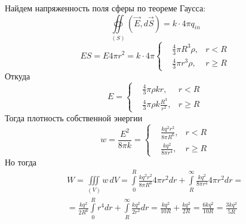 \documentclass[a4paper,14pt]{extarticle}
\begin{document}
\begin{figure}[H]
    \centering
\end{figure}
Найдем напряженность поля сферы по теореме Гаусса:
\begin{equation}
	\oiint\limits_{(S)}(\vec{E},d\vec{S})=k\cdot4\pi q_{in}
\end{equation}
\begin{equation}
	ES=E4\pi r^2=k\cdot4\pi\left\{
	\begin{aligned}
		&\frac43\pi R^3 \rho, & r<R\\
		&\frac43\pi r^3 \rho, & r\geq R
	\end{aligned}
	\right.
\end{equation}
Откуда
\begin{equation}
	E=\left\{
	\begin{aligned}
		&\frac43\pi \rho k r, & r<R\\
		&\frac43\pi \rho k \frac{R^3}{r^2}, & r\geq R
	\end{aligned}
	\right.
\end{equation}
Тогда плотность собственной энергии
\begin{equation}
	w=\frac{E^2}{8\pi k}=\left\{
	\begin{aligned}
		&\frac{kq^2r^2}{8\pi R^6}, & r<R\\
		&\frac{kq^2}{8\pi r^4}, & r\geq R
	\end{aligned}
	\right.
\end{equation}
Но тогда
\begin{gather}
	W=\iiint\limits_{(V)}w\,dV=
	\int\limits_0^R
	\frac{kq^2r^2}{8\pi R^6}
	4\pi r^2 dr
	+
	\int\limits_R^\infty
	\frac{kq^2}{8\pi r^4}
	4\pi r^2 dr=\\\nonumber=
	\frac{kq^2}{2 R^6}
\int\limits_0^R	
	 r^4 dr
	+
	\int\limits_R^\infty
	\frac{kq^2}{2r^2}
	dr=\frac{kq^2}{10R}+\frac{kq^2}{2R}=\frac{6kq^2}{10R}=\frac{3kq^2}{5R}
\end{gather}
\end{document}
